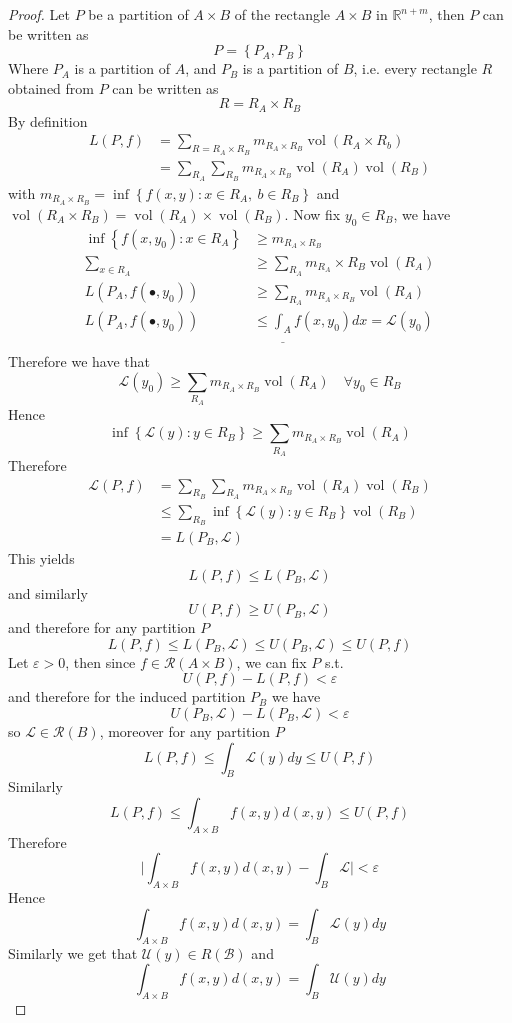 \documentclass[11pt,a4paper]{article}
\theoremstyle{definition}
\theoremstyle{plain}
\theoremstyle{remark}
\newcommand{\R}{\mathbb{R}}
\renewcommand{\set}[1]{\left\{ #1 \right\}}
\newcommand{\abs}[1]{\lvert #1 \rvert}
\newcommand{\vol}{\operatorname{vol}}
\begin{document}
\begin{proof}
    Let $P$ be a partition of $A \times B$ of the rectangle $A \times B$ in $\R^{n+m}$, then $P$ can be written as 
    $$P = \set{P_A, P_B}$$
    Where $P_A$ is a partition of $A$, and $P_B$ is a partition of $B$, i.e. every rectangle $R$ obtained from $P$ can be written as 
    $$R = R_A \times R_B$$
    By definition 
    \begin{align*}
        L(P,f ) &= \sum_{R = R_A \times R_B} m_{R_A \times R_B} \vol (R_A \times R_b) \\
        &= \sum_{R_A} \sum_{R_B} m_{R_A \times R_B} \vol (R_A) \vol (R_B)
    \end{align*}
    with $m_{R_A \times R_B} = \inf \set{f(x,y) \colon x \in R_A, \ b \in R_B}$ and $\vol (R_A \times R_B) = \vol (R_A) \times \vol (R_B)$. 
    Now fix $y_0 \in R_B$, we have 
    \begin{align*}
        \inf \set{f(x,y_0) \colon x \in R_A} &\ge m_{R_A \times R_B} \\
        \sum_{x \in R_A} &\ge \sum_{R_A} m_{R_A} \times R_{B} \vol (R_A) \\
        L(P_A, f(\bullet, y_0)) &\ge \sum_{R_A} m_{R_A \times R_B} \vol (R_A) \\
        L(P_A, f(\bullet, y_0)) &\le \underline{\int_A} f(x,y_0) dx = \mathcal{L}(y_0) \\
    \end{align*}  
    Therefore we have that 
    $$\mathcal{L}(y_0) \ge \sum_{R_A} m_{R_A \times R_B} \vol (R_A) \quad \forall y_0 \in R_B$$
    Hence 
    $$\inf \set{\mathcal{L}(y) \colon y \in R_B} \ge \sum_{R_A} m_{R_A \times R_B} \vol (R_A)$$
    Therefore 
    \begin{align*}
        \mathcal{L}(P,f) &= \sum_{R_B} \sum_{R_A} m_{R_A \times R_B} \vol (R_A) \vol (R_B) \\
        &\le \sum_{R_B} \inf \set{\mathcal{L}(y) \colon y \in R_B} \vol (R_B) \\
        &= L(P_B, \mathcal{L})
    \end{align*} 
    This yields 
    $$L(P,f) \le L(P_B, \mathcal{L})$$
    and similarly 
    $$U(P,f) \ge U(P_B, \mathcal{L})$$
    and therefore for any partition $P$
    $$L(P,f) \le L(P_B, \mathcal{L}) \le U(P_B, \mathcal{L}) \le U(P,f)$$
    Let $\varepsilon > 0$, then since $f \in \mathcal{R}(A \times B)$, we can fix $P$ s.t. 
    $$U(P,f) - L(P,f) < \varepsilon$$
    and therefore for the induced partition $P_B$ we have 
    $$U(P_B, \mathcal{L}) - L(P_B, \mathcal{L}) < \varepsilon$$
    so $\mathcal{L} \in \mathcal{R}(B)$, moreover for any partition $P$
    $$L(P,f) \le \int_B \mathcal{L}(y) dy \le U(P,f)$$
    Similarly 
    $$L(P,f) \le \int_{A \times B} f(x,y) d(x,y) \le U(P,f)$$
    Therefore 
    $$\abs{\int_{A \times B} f(x,y) d(x,y) - \int_B \mathcal{L}} < \varepsilon$$
    Hence 
    $$\int_{A \times B} f(x,y) d(x,y) = \int_B \mathcal{L}(y) dy$$
    Similarly we get that $\mathcal{U}(y) \in R(\mathcal{B})$ and 
    $$\int_{A \times B} f(x,y) d(x,y) = \int_B \mathcal{U}(y) dy$$
\end{proof}
\end{document}
